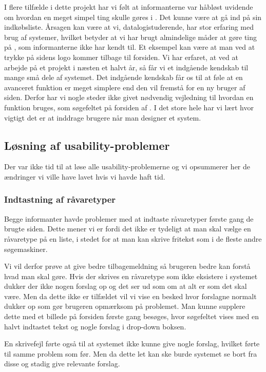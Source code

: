 I flere tilfælde i dette projekt har vi følt at informanterne var håbløst uvidende om hvordan en meget simpel ting skulle gøres i \Foodl. Det kunne \fx være at gå ind på sin indkøbsliste. Årsagen kan være at vi, datalogistuderende, har stor erfaring med brug af systemer, hvilket betyder at vi har brugt almindelige måder at gøre ting på \Foodl{}, som informanterne ikke har kendt til. Et eksempel kan være at man ved at trykke på sidens logo kommer tilbage til forsiden.
Vi har erfaret, at ved at arbejde på et projekt i næsten et halvt år, så får vi et indgående kendskab til mange små dele af systemet. Det indgående kendskab får os til at føle at en avanceret funktion er meget simplere end den vil fremstå for en ny bruger af siden. Derfor har vi nogle steder ikke givet nødvendig vejledning til hvordan en funktion bruges, som \fx søgefeltet på forsiden af \Foodl. I det store hele har vi lært hvor vigtigt det er at inddrage brugere når man designer et system.


\subsection{Løsning af usability-problemer}
Der var ikke tid til at løse alle usability-problemerne og vi opsummerer her de ændringer vi ville have lavet hvis vi havde haft tid.

\subsubsection{Indtastning af råvaretyper}
Begge informanter havde problemer med at indtaste råvaretyper første gang de brugte siden.
Dette mener vi er fordi det ikke er tydeligt at man skal vælge en råvaretype på en liste, i stedet for at man kan skrive fritekst som i de fleste andre søgemaskiner.

Vi vil derfor prøve at give bedre tilbagemeldning så brugeren bedre kan forstå hvad man skal gøre. 
Hvis der skrives en råvaretype som ikke eksistere i systemet dukker der ikke nogen forslag op og det ser ud som om at alt er som det skal være.
Men da dette ikke er tilfældet vil vi vise en besked hvor forslagne normalt dukker op som gør brugeren opmærksom på problemet. Man kunne supplere dette med et billede på forsiden første gang \Foodl besøges, hvor søgefeltet vises med en halvt indtastet tekst og nogle forslag i drop-down boksen. 

En skrivefejl førte også til at systemet ikke kunne give nogle forslag, hvilket førte til samme problem som før. 
Men da dette let kan ske burde systemet se bort fra disse og stadig give relevante forslag.

